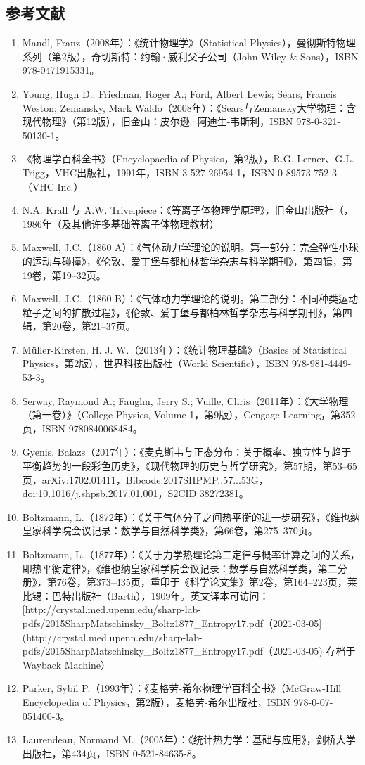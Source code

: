 \subsection{参考文献}
\begin{enumerate}
\item Mandl, Franz（2008年）：《统计物理学》（Statistical Physics），曼彻斯特物理系列（第2版），奇切斯特：约翰·威利父子公司（John Wiley & Sons），ISBN 978-0471915331。
\item Young, Hugh D.; Friedman, Roger A.; Ford, Albert Lewis; Sears, Francis Weston; Zemansky, Mark Waldo（2008年）：《Sears与Zemansky大学物理：含现代物理》（第12版），旧金山：皮尔逊·阿迪生-韦斯利，ISBN 978-0-321-50130-1。
\item 《物理学百科全书》（Encyclopaedia of Physics，第2版），R.G. Lerner、G.L. Trigg，VHC出版社，1991年，ISBN 3-527-26954-1，ISBN 0-89573-752-3（VHC Inc.）
\item N.A. Krall 与 A.W. Trivelpiece：《等离子体物理学原理》，旧金山出版社（，1986年（及其他许多基础等离子体物理教材）
\item Maxwell, J.C.（1860 A）：《气体动力学理论的说明。第一部分：完全弹性小球的运动与碰撞》，《伦敦、爱丁堡与都柏林哲学杂志与科学期刊》，第四辑，第19卷，第19–32页。
\item Maxwell, J.C.（1860 B）：《气体动力学理论的说明。第二部分：不同种类运动粒子之间的扩散过程》，《伦敦、爱丁堡与都柏林哲学杂志与科学期刊》，第四辑，第20卷，第21–37页。
\item Müller-Kirsten, H. J. W.（2013年）：《统计物理基础》（Basics of Statistical Physics，第2版），世界科技出版社（World Scientific），ISBN 978-981-4449-53-3。
\item Serway, Raymond A.; Faughn, Jerry S.; Vuille, Chris（2011年）：《大学物理（第一卷）》（College Physics, Volume 1，第9版），Cengage Learning，第352页，ISBN 9780840068484。
\item Gyenis, Balazs（2017年）：《麦克斯韦与正态分布：关于概率、独立性与趋于平衡趋势的一段彩色历史》，《现代物理的历史与哲学研究》，第57期，第53–65页，arXiv:1702.01411，Bibcode:2017SHPMP..57...53G，doi:10.1016/j.shpsb.2017.01.001，S2CID 38272381。
\item Boltzmann, L.（1872年）：《关于气体分子之间热平衡的进一步研究》，《维也纳皇家科学院会议记录：数学与自然科学类》，第66卷，第275–370页。
\item Boltzmann, L.（1877年）：《关于力学热理论第二定律与概率计算之间的关系，即热平衡定律》，《维也纳皇家科学院会议记录：数学与自然科学类，第二分册》，第76卷，第373–435页，重印于《科学论文集》第2卷，第164–223页，莱比锡：巴特出版社（Barth），1909年。英文译本可访问：[http://crystal.med.upenn.edu/sharp-lab-pdfs/2015SharpMatschinsky\_Boltz1877\_Entropy17.pdf（2021-03-05](http://crystal.med.upenn.edu/sharp-lab-pdfs/2015SharpMatschinsky_Boltz1877_Entropy17.pdf（2021-03-05) 存档于 Wayback Machine）
\item Parker, Sybil P.（1993年）：《麦格劳-希尔物理学百科全书》（McGraw-Hill Encyclopedia of Physics，第2版），麦格劳-希尔出版社，ISBN 978-0-07-051400-3。
\item Laurendeau, Normand M.（2005年）：《统计热力学：基础与应用》，剑桥大学出版社，第434页，ISBN 0-521-84635-8。
\end{enumerate}

